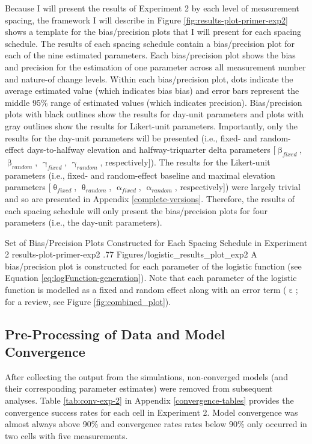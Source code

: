 \documentclass[
12pt, %
twoside,
english]{guelphthesis}
\begin{document}
Because I will present the results of Experiment 2 by each level of measurement spacing, the framework I will describe in Figure \ref{fig:results-plot-primer-exp2} shows a template for the bias/precision plots that I will present for each spacing schedule. The results of each spacing schedule contain a bias/precision plot for each of the nine estimated parameters. Each bias/precision plot shows the bias and precision for the estimation of one parameter across all measurement number and nature-of change levels. Within each bias/precision plot, dots indicate the average estimated value (which indicates bias bias) and error bars represent the middle 95\% range of estimated values (which indicates precision). Bias/precision plots with black outlines show the results for day-unit parameters and plots with gray outlines show the results for Likert-unit parameters. Importantly, only the results for the day-unit parameters will be presented (i.e., fixed- and random-effect days-to-halfway elevation and halfway-triquarter delta parameters {[}\(\upbeta_{fixed}\), \(\upbeta_{random}\), \(\upgamma_{fixed}\), \(\upgamma_{random}\), respectively{]}). The results for the Likert-unit parameters (i.e., fixed- and random-effect baseline and maximal elevation parameters {[}\(\uptheta_{fixed}\), \(\uptheta_{random}\), \(\upalpha_{fixed}\), \(\upalpha_{random}\), respectively{]}) were largely trivial and so are presented in Appendix \ref{complete-versions}. Therefore, the results of each spacing schedule will only present the bias/precision plots for four parameters (i.e., the day-unit parameters).
\begin{apaFigure}
[portrait]
[samepage]
[-0.2cm]
{Set of Bias/Precision Plots Constructed for Each Spacing Schedule in Experiment 2}
{results-plot-primer-exp2}
{.77}
{Figures/logistic_results_plot_exp2}
{A bias/precision plot is constructed for each parameter of the logistic function (see Equation \ref{eq:logFunction-generation}). Note that each parameter of the logistic function is modelled as a fixed and random effect along with an error term ($\upepsilon$; for a review, see Figure \ref{fig:combined_plot}).}
\end{apaFigure}
\hypertarget{pre-processing-of-data-and-model-convergence-1}{%
\subsection{Pre-Processing of Data and Model Convergence}\label{pre-processing-of-data-and-model-convergence-1}}

After collecting the output from the simulations, non-converged models
(and their corresponding parameter estimates) were removed from
subsequent analyses. Table \ref{tab:conv-exp-2} in Appendix \ref{convergence-tables} provides the convergence
success rates for each cell in Experiment 2. Model convergence was almost always above 90\% and convergence rates
rates below 90\% only occurred in two cells with five measurements.
\end{document}
